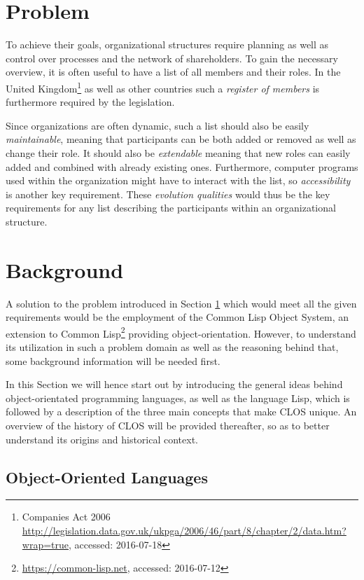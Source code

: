 \documentclass[oribibl]{llncs}
\begin{document}
\section{Problem}
\label{sec:problem}

To achieve their goals, organizational structures require planning as well as control over processes and the network of shareholders. \cite[42f.]{Schmidt2000} To gain the necessary overview, it is often useful to have a list of all members and their roles. In the United Kingdom\footnote{Companies Act 2006 \url{http://legislation.data.gov.uk/ukpga/2006/46/part/8/chapter/2/data.htm?wrap=true}, accessed: 2016-07-18} as well as other countries such a \emph{register of members} is furthermore required by the legislation.

Since organizations are often dynamic, such a list should also be easily \emph{maintainable}, meaning that participants can be both added or removed as well as change their role. It should also be \emph{extendable} meaning that new roles can easily added and combined with already existing ones. Furthermore, computer programs used within the organization might have to interact with the list, so \emph{accessibility} is another key requirement. These \emph{evolution qualities} \cite{young2001effective} would thus be the key requirements for  any list describing the participants within an organizational structure.


\section{Background}
\label{sec:background}
A solution to the problem introduced in Section \ref{sec:problem} which would meet all the given requirements would be the employment of the Common Lisp Object System, an extension to Common Lisp\footnote{\url{https://common-lisp.net}, accessed: 2016-07-12} providing object-orientation. \cite{demichiel1987common} However, to understand its utilization in such a problem domain as well as the reasoning behind that, some background information will be needed first.

In this Section we will hence start out by introducing the general ideas behind object-orientated programming languages, as well as the language Lisp, which is followed by a description of the three main concepts that make CLOS unique. An overview of the history of CLOS will be provided thereafter, so as to better understand its origins and historical context.

\subsection{Object-Oriented Languages}
\label{sec:oo}
\end{document}
